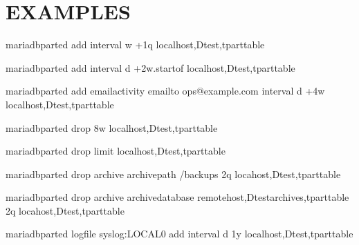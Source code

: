 \documentclass[letterpaper,10pt,english]{sphinxmanual}
\begin{document}
\section{EXAMPLES}
\label{\detokenize{mariadb-parted:examples}}
\begin{sphinxVerbatim}[commandchars=\\\{\}]
mariadb\PYGZhy{}parted \PYGZhy{}\PYGZhy{}add \PYGZhy{}\PYGZhy{}interval w +1q localhost,Dtest,tpart\PYGZus{}table

mariadb\PYGZhy{}parted \PYGZhy{}\PYGZhy{}add \PYGZhy{}\PYGZhy{}interval d +2w.startof localhost,Dtest,tpart\PYGZus{}table

mariadb\PYGZhy{}parted \PYGZhy{}\PYGZhy{}add \PYGZhy{}\PYGZhy{}email\PYGZhy{}activity \PYGZhy{}\PYGZhy{}email\PYGZhy{}to ops@example.com 
           \PYGZhy{}\PYGZhy{}interval d +4w localhost,Dtest,tpart\PYGZus{}table

mariadb\PYGZhy{}parted \PYGZhy{}\PYGZhy{}drop \PYGZhy{}8w localhost,Dtest,tpart\PYGZus{}table

mariadb\PYGZhy{}parted \PYGZhy{}\PYGZhy{}drop \PYGZhy{}\PYGZhy{}limit   
           localhost,Dtest,tpart\PYGZus{}table

mariadb\PYGZhy{}parted \PYGZhy{}\PYGZhy{}drop \PYGZhy{}\PYGZhy{}archive \PYGZhy{}\PYGZhy{}archive\PYGZhy{}path /backups \PYGZhy{}2q 
           locahost,Dtest,tpart\PYGZus{}table

mariadb\PYGZhy{}parted \PYGZhy{}\PYGZhy{}drop \PYGZhy{}\PYGZhy{}archive \PYGZhy{}\PYGZhy{}archive\PYGZhy{}database remotehost,Dtest\PYGZus{}archives,tpart\PYGZus{}table \PYGZhy{}2q 
           locahost,Dtest,tpart\PYGZus{}table

mariadb\PYGZhy{}parted \PYGZhy{}\PYGZhy{}logfile syslog:LOCAL0 \PYGZhy{}\PYGZhy{}add \PYGZhy{}\PYGZhy{}interval d 1y 
           localhost,Dtest,tpart\PYGZus{}table
\end{sphinxVerbatim}
\end{document}
